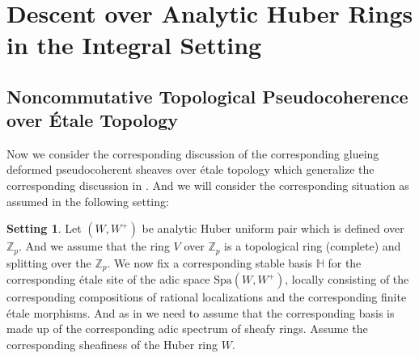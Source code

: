 \documentclass[12pt]{amsart}
\theoremstyle{definition}
\numberwithin{equation}{section}
\newtheorem{setting}[theorem]{Setting}
\begin{document}
\
%
%
%






\section{Descent over Analytic Huber Rings in the Integral Setting} \label{chapter3}

\subsection{Noncommutative Topological Pseudocoherence over \'Etale Topology}

\indent Now we consider the corresponding discussion of the corresponding glueing deformed pseudocoherent sheaves over \'etale topology which generalize the corresponding discussion in \cite{Ked1}.  And we will consider the corresponding situation as assumed in the following setting:




\begin{setting}
Let $(W,W^+)$ be analytic Huber uniform pair which is defined over $\mathbb{Z}_p$. And we assume that the ring $V$ over $\mathbb{Z}_p$ is a topological ring (complete) and splitting over the $\mathbb{Z}_p$. We now fix a corresponding stable basis $\mathbb{H}$ for the corresponding \'etale site of the adic space $\mathrm{Spa}(W,W^+)$, locally consisting of the corresponding compositions of rational localizations and the corresponding finite \'etale morphisms. And as in \cite[Hypothesis 1.10.3]{Ked1} we need to assume that the corresponding basis is made up of the corresponding adic spectrum of sheafy rings. Assume the corresponding sheafiness of the Huber ring $W$.
\end{setting}
\end{document}
